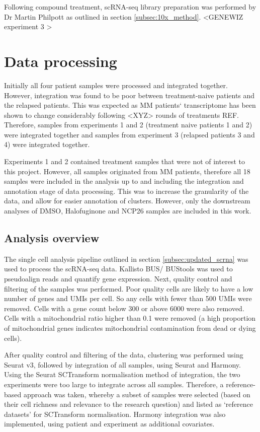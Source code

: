 Following compound treatment, scRNA-seq library preparation was performed by Dr Martin Philpott as outlined in section \ref{subsec:10x_method}.
<GENEWIZ experiment 3 >


\section{Data processing}
Initially all four patient samples were processed and integrated together.
However, integration was found to be poor between treatment-naive patients and the relapsed patients.
This was expected as MM patients` transcriptome has been shown to change considerably following <XYZ> rounds of treatments {REF}.
Therefore, samples from experiments 1 and 2 (treatment naive patients 1 and 2) were integrated together and samples from experiment 3 (relapsed patients 3 and 4) were integrated together.

Experiments 1 and 2 contained treatment samples that were not of interest to this project.
However, all samples originated from MM patients, therefore all 18 samples were included in the analysis up to and including the integration and annotation stage of data processing.
This was to increase the granularity of the data, and allow for easier annotation of clusters.
However, only the downstream analyses of DMSO, Halofuginone and NCP26 samples are included in this work.

\subsection{Analysis overview}

The single cell analysis pipeline outlined in section \ref{subsec:updated_scrna} was used to process the scRNA-seq data.
Kallisto BUS/ BUStools was used to pseudoalign reads and quantify gene expression.
Next, quality control and filtering of the samples was performed.
Poor quality cells are likely to have a low number of genes and UMIs per cell.
So any cells with fewer than 500 UMIs were removed.
Cells with a gene count below 300 or above 6000 were also removed.
Cells with a mitochondrial ratio higher than 0.1 were removed (a high proportion of mitochondrial genes indicates mitochondrial contamination from dead or dying cells).

After quality control and filtering of the data, clustering was performed using Seurat v3, followed by integration of all samples, using Seurat and Harmony.
Using the Seurat SCTransform normalisation method of integration, the two experiments were too large to integrate across all samples.
Therefore, a reference-based approach was taken, whereby a subset of samples were selected (based on their cell richness and relevance to the research question) and listed as `reference datasets' for SCTransform normalisation.
Harmony integration was also implemented, using patient and experiment as additional covariates.


